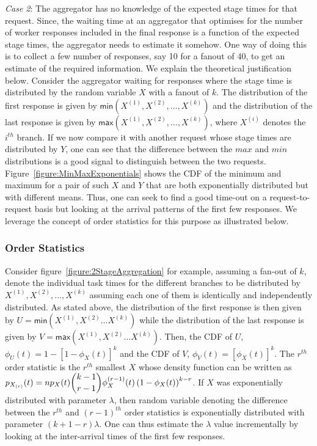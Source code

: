 \documentclass[letterpaper,twocolumn,10pt]{article}
\begin{document}
\emph{Case 2}: The aggregator has no knowledge of the expected stage times for that request. Since, the waiting time at an aggregator that optimises for the number of worker responses included in the final response is a function of the expected stage times, the aggregator needs to estimate it somehow.
One way of doing this is to collect a few number of responses, say 10 for a fanout of 40, to get an estimate of the required information. We explain the theoretical justification below.
Consider the aggregator waiting for responses where the stage time is distributed by the random variable $X$ with a fanout of $k$. The distribution of the first response is given by 
$\textsf{min}(X^{(1)}, X^{(2)}, \dots, X^{(k)})$ and the distribution of the last response is given by
$\textsf{max}(X^{(1)}, X^{(2)}, \dots, X^{(k)})$, where $X^{(i)}$ denotes the $i^{th}$ branch. If we now compare it with another request whose stage times are distributed by $Y$, one can see that the difference between the $max$ and $min$ distributions is a good signal to distinguish between the two requests. 
Figure~\ref{figure:MinMaxExponentials} shows the CDF of the minimum and maximum for a pair of such $X$ and $Y$ that are both exponentially distributed but with different means. Thus, 
one can seek to find a good time-out on a request-to-request basis but looking at the arrival patterns of the first few responses. We leverage the concept of order statistics for this purpose as illustrated below.

\subsubsection{Order Statistics}
Consider figure~\ref{figure:2StageAggregation} for example, assuming a fan-out of $k$, denote the individual task times for the different branches to be distributed by $X^{(1)}, X^{(2)}, \dots, X^{(k)}$ assuming each one of them is identically and independently distributed. 
As stated above, the distribution of the first response is then given by 
$U = \textsf{min}(X^{(1)}, X^{(2)} \dots X^{(k)})$ while the distribution of the last response is given by $V = \textsf{max}(X^{(1)}, X^{(2)} \dots X^{(k)})$. 
Then, the CDF of $U$, $\phi_U(t) = 1 - \left[1 - \phi_{X}(t)\right]^k$ and the CDF of $V$, 
$\phi_V(t) = \left[\phi_{X}(t)\right]^{k}$. 
The $r^{th}$ order statistic is the $r^{th}$ smallest $X$ whose density function can be written 
as $p_{X_{(r)}}(t) = np_X(t)\dbinom{k - 1}{r - 1}\phi_X^{(r-1)}(t)\left(1 - \phi_X(t)\right)^{k-r}$. 
If $X$ was exponentially distributed with parameter $\lambda$, then random variable denoting the 
difference between the $r^{th}$ and $(r-1)^{th}$ order statistics is exponentially distributed with parameter $(k + 1 - r)\lambda$. One can thus estimate the $\lambda$ value incrementally by looking at the inter-arrival times of the first few responses.
\end{document}

